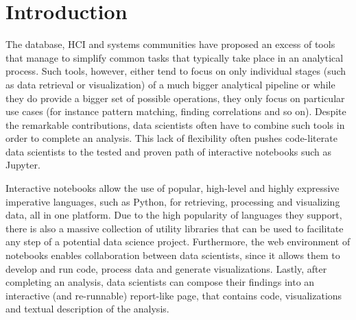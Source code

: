 \section{Introduction}
\label{section:introduction}




The database, HCI and systems communities have proposed an excess of tools that manage to simplify common tasks that typically take place in an analytical process. Such tools, however, either tend to focus on only individual stages (such as data retrieval or visualization) of a much bigger analytical pipeline or while they do provide a bigger set of possible operations, they only focus on particular use cases (for instance pattern matching, finding correlations and so on). Despite the remarkable contributions, data scientists often have to combine such tools in order to complete an analysis. This lack of flexibility often pushes code-literate data scientists to the tested and proven path of interactive notebooks such as Jupyter.

Interactive notebooks allow the use of popular, high-level and highly expressive imperative languages, such as Python, for retrieving, processing and visualizing data, all in one platform. Due to the high popularity of languages they support, there is also a massive collection of utility libraries that can be used to facilitate any step of a potential data science project. Furthermore, the web environment of notebooks enables collaboration between data scientists, since it allows them to develop and run code, process data and generate visualizations. Lastly, after completing an analysis, data scientists can compose their findings into an interactive (and re-runnable) report-like page, that contains code, visualizations and textual description of the analysis.

